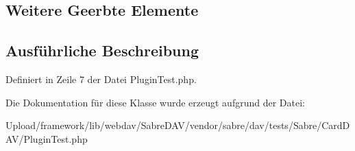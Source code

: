 \subsection*{Weitere Geerbte Elemente}


\subsection{Ausführliche Beschreibung}


Definiert in Zeile 7 der Datei Plugin\+Test.\+php.



Die Dokumentation für diese Klasse wurde erzeugt aufgrund der Datei\+:\begin{DoxyCompactItemize}
\item 
Upload/framework/lib/webdav/\+Sabre\+D\+A\+V/vendor/sabre/dav/tests/\+Sabre/\+Card\+D\+A\+V/Plugin\+Test.\+php\end{DoxyCompactItemize}

